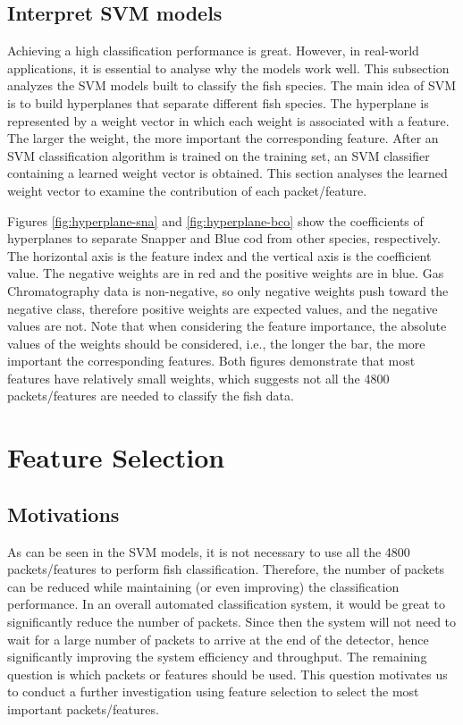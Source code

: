 \documentclass[runningheads]{llncs}
\begin{document}
\subsection{Interpret SVM models}

Achieving a high classification performance is great. 
However, in real-world applications, it is essential to analyse why the models work well.
This subsection analyzes the SVM models built to classify the fish species. 
The main idea of SVM is to build hyperplanes that separate different fish species. 
The hyperplane is represented by a weight vector in which each weight is associated with a feature. 
The larger the weight, the more important the corresponding feature. 
After an SVM classification algorithm is trained on the training set, an SVM classifier containing a learned weight vector is obtained. 
This section analyses the learned weight vector to examine the contribution of each packet/feature.

Figures \ref{fig:hyperplane-sna} and \ref{fig:hyperplane-bco} show the coefficients of hyperplanes to separate Snapper and Blue cod from other species, respectively. 
The horizontal axis is the feature index and the vertical axis is the coefficient value. 
The negative weights are in red and the positive weights are in blue. 
Gas Chromatography data is non-negative, so only negative weights push toward the negative class, therefore positive weights are expected values, and the negative values are not.
Note that when considering the feature importance, the absolute values of the weights should be considered, i.e., the longer the bar, the more important the corresponding features. 
Both figures demonstrate that most features have relatively small weights, which suggests not all the 4800 packets/features are needed to classify the fish data.  

\section{Feature Selection}

\subsection{Motivations}

As can be seen in the SVM models, it is not necessary to use all the 4800 packets/features to perform fish classification.
Therefore, the number of packets can be reduced while maintaining (or even improving) the classification performance.
In an overall automated classification system, it would be great to significantly reduce the number of packets.
Since then the system will not need to wait for a large number of packets to arrive at the end of the detector, hence significantly improving the system efficiency and throughput. 
The remaining question is which packets or features should be used. 
This question motivates us to conduct a further investigation using feature selection to select the most important packets/features. 
\end{document}
